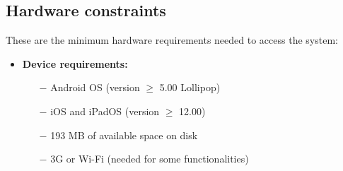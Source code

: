 \subsection{Hardware constraints}
These are the minimum hardware requirements needed to access the system:
\begin{itemize}
\item \textbf{Device requirements:}
\begin{itemize}
    \item[$-$] Android OS (version $ \geq $ 5.00 Lollipop)
    \item[$-$] iOS and iPadOS (version $ \geq $ 12.00)
    \item[$-$] 193 MB of available space on disk
    \item[$-$] 3G or Wi-Fi (needed for some functionalities)
\end{itemize}

\end{itemize}
